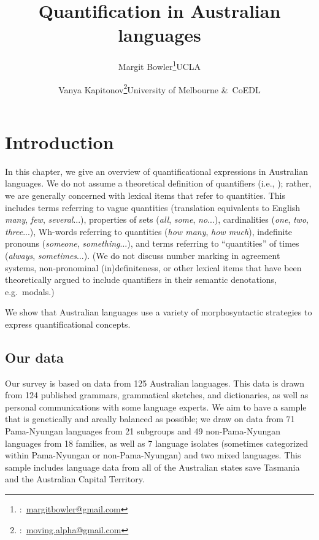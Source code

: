 \documentclass[12pt,egregdoesnotlikesansseriftitles]{scrartcl}
\title{Quantification in Australian languages}
\author{Margit Bowler\thanks{\Letter:~\href{mailto:margitbowler@gmail.com}{margitbowler@gmail.com}}\authorcr UCLA \and \vspace{-.5cm}Vanya Kapitonov\thanks{\Letter:~\href{mailto:moving.alpha@gmail.com}{moving.alpha@gmail.com}}\authorcr University of Melbourne \&\ CoEDL}
\begin{document}
\maketitle

\section{Introduction}

In this chapter, we give an overview of quantificational expressions in Australian languages. We do not assume a theoretical definition of quantifiers (i.e., \citealt{heimkratzer98}); rather, we are generally concerned with lexical items that refer to quantities. This includes terms referring to vague quantities (translation equivalents to English \textit{many}, \textit{few}, \textit{several}...), properties of sets (\textit{all}, \textit{some}, \textit{no}...), cardinalities (\textit{one}, \textit{two}, \textit{three}...), Wh-words referring to quantities (\textit{how many}, \textit{how much}),
 indefinite pronouns (\textit{someone}, \textit{something}...), and terms referring to ``quantities'' of times (\textit{always}, \textit{sometimes}...). (We do not discuss number marking in agreement systems, non-pronominal (in)definiteness, or other lexical items that have been theoretically argued to include quantifiers in their semantic denotations, e.g.\ modals.)


We show that Australian languages use a variety of morphosyntactic strategies to express quantificational concepts. 


\subsection{Our data}


Our survey is based on data from 125 Australian languages. This data is drawn from 124 published grammars, grammatical sketches, and dictionaries, as well as personal communications with some language experts. We aim to have a sample that is genetically and areally balanced as possible; we draw on data from 71 Pama-Nyungan languages from 21 subgroups and 49 non-Pama-Nyungan languages from 18 families, as well as 7 language isolates (sometimes categorized within Pama-Nyungan or non-Pama-Nyungan) and two mixed languages. This sample includes language data from all of the Australian states save Tasmania and the Australian Capital Territory.
\end{document}
